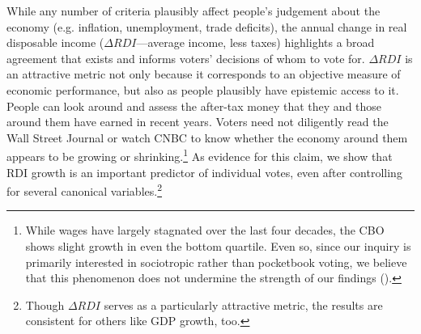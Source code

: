 \documentclass[11pt]{article}
\begin{document}
While any number of criteria plausibly affect people's judgement about the economy (e.g. inflation, unemployment, trade deficits), the annual change in real disposable income ($\Delta RDI$---average income, less taxes) highlights a broad agreement that exists and informs voters' decisions of whom to vote for. $\Delta RDI$ is an attractive metric not only because it corresponds to an objective measure of economic performance, but also as people plausibly have epistemic access to it. People can look around and assess the after-tax money that they and those around them have earned in recent years. Voters need not diligently read the Wall Street Journal or watch CNBC to know whether the economy around them appears to be growing or shrinking.\footnote{While wages have largely stagnated over the last four decades, the CBO shows slight growth in even the bottom quartile. Even so, since our inquiry is primarily interested in sociotropic rather than pocketbook voting, we believe that this phenomenon does not undermine the strength of our findings (\cite{congress2011trends}).} %
As evidence for this claim, we show that RDI growth is an important predictor of individual votes, even after controlling for several  canonical variables.\footnote{Though $\Delta RDI$ serves as a particularly attractive metric, the results are consistent for others like GDP growth, too.}
\end{document}
